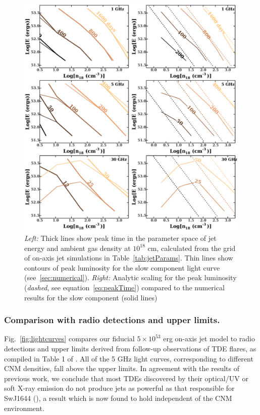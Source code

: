\documentclass[usenatbib,fleqn]{mnras}
\begin{document}
\begin{figure}
  \includegraphics[width=16cm]{tp_contours_new.pdf}
  \caption{\label{fig:ContoursTp} {\it {Left:}} Thick lines show peak
    time in the parameter space of jet energy and ambient gas density
    at $10^{18}$ cm, calculated from the grid of on-axis jet
    simulations in Table~\ref{tab:jetParams}. Thin lines show contours
    of peak luminosity for the slow component light curve
    (see~\ref{sec:numerical}). {\it Right:} Analytic scaling for the
    peak luminosity ({\it dashed}, see equation~\ref{eq:peakTime})
    compared to the numerical results for the slow component (solid
    lines)}
\end{figure}

\subsubsection{Comparison with radio detections and upper limits.}
\label{sec:upLims}

Fig.~\ref{fig:lightcurves} compares our fiducial $5\times 10^{53}$ erg
on-axis jet model to radio detections and upper limits derived from
follow-up observations of TDE flares, as compiled in Table 1 of
\citealt{Mimica+2015}.  All of the 5 GHz light curves, corresponding
to different CNM densities, fall above the upper limits.  In agreement
with the results of previous work, we conclude that most TDEs
discovered by their optical/UV or soft X-ray emission do not produce
jets as powerful as that responsible for SwJ1644
(\citealt{Bower+2013,van-Velzen+2013,Mimica+2015}), a result which is
now found to hold independent of the CNM environment.
\end{document}
